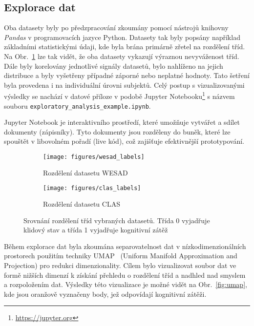 \subsection{Explorace dat}
\label{subsec:explorace_dat}
Oba datasety byly po předzpracování zkoumány pomocí nástrojů knihovny
\textit{Pandas} v programovacích jazyce Python. Datasety tak byly popsány
například základními statistickými údaji, kde byla brána primárně zřetel na
rozdělení tříd. Na Obr.~\ref{fig:rozdeleni_trid} lze tak vidět, že oba datasety
vykazují výraznou nevyváženost tříd. Dále byly korelovány jednotlivé signály
datasetů, bylo nahlíženo na jejich distribuce a byly vyšetřeny případné záporné
nebo neplatné hodnoty. Tato šetření byla provedena i na individuální úrovni
subjektů. Celý postup s vizualizovanými výsledky se nachází v datové příloze v
podobě Jupyter Notebooku\footnote{\url{https://jupyter.org}} s názvem souboru
\texttt{exploratory\_analysis\_example.ipynb}.

Jupyter Notebook je interaktivního prostředí, které umožňuje vytvářet a sdílet
dokumenty (zápisníky). Tyto dokumenty jsou rozděleny do buněk, které lze
spouštět v libovolném pořadí (live kód), což zajišťuje efektivnější
prototypování.

\begin{figure}[!htb]
    \begin{subfigure}[h]{0.48\linewidth}
        \texttt{[image: figures/wesad\_labels]}
        \caption{Rozdělení datasetu WESAD}
    \end{subfigure}
    \hfill
    \begin{subfigure}[h]{0.48\linewidth}
        \texttt{[image: figures/clas\_labels]}
        \caption{Rozdělení datasetu CLAS}
    \end{subfigure}
    \caption{Srovnání rozdělení tříd vybraných datasetů. Třída 0 vyjadřuje
        klidový stav a třída 1 vyjadřuje kognitivní zátěž}
    \label{fig:rozdeleni_trid}
\end{figure}

Během explorace dat byla zkoumána separovatelnost dat v nízkodimenzionálních
prostorech použitím techniky \gls{UMAP}~\cite{umap2018} (Uniform Manifold
Approximation and Projection) pro redukci dimenzionality. Cílem bylo
vizualizovat soubor dat ve formě nižších dimenzí k získání přehledu o rozdělení
tříd a nadhled nad smyslem a rozpoložením dat. Výsledky této vizualizace je
možné vidět na Obr.~\ref{fig:umap}, kde jsou oranžově vyznačeny body, jež
odpovídají kognitivní zátěži.

